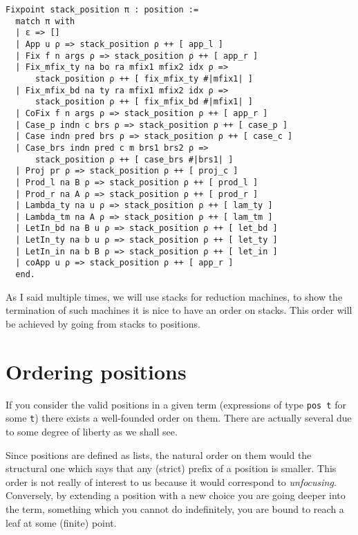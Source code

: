 \begin{verbatim}
Fixpoint stack_position π : position :=
  match π with
  | ε => []
  | App u ρ => stack_position ρ ++ [ app_l ]
  | Fix f n args ρ => stack_position ρ ++ [ app_r ]
  | Fix_mfix_ty na bo ra mfix1 mfix2 idx ρ =>
      stack_position ρ ++ [ fix_mfix_ty #|mfix1| ]
  | Fix_mfix_bd na ty ra mfix1 mfix2 idx ρ =>
      stack_position ρ ++ [ fix_mfix_bd #|mfix1| ]
  | CoFix f n args ρ => stack_position ρ ++ [ app_r ]
  | Case_p indn c brs ρ => stack_position ρ ++ [ case_p ]
  | Case indn pred brs ρ => stack_position ρ ++ [ case_c ]
  | Case_brs indn pred c m brs1 brs2 ρ =>
      stack_position ρ ++ [ case_brs #|brs1| ]
  | Proj pr ρ => stack_position ρ ++ [ proj_c ]
  | Prod_l na B ρ => stack_position ρ ++ [ prod_l ]
  | Prod_r na A ρ => stack_position ρ ++ [ prod_r ]
  | Lambda_ty na u ρ => stack_position ρ ++ [ lam_ty ]
  | Lambda_tm na A ρ => stack_position ρ ++ [ lam_tm ]
  | LetIn_bd na B u ρ => stack_position ρ ++ [ let_bd ]
  | LetIn_ty na b u ρ => stack_position ρ ++ [ let_ty ]
  | LetIn_in na b B ρ => stack_position ρ ++ [ let_in ]
  | coApp u ρ => stack_position ρ ++ [ app_r ]
  end.
\end{verbatim}

As I said multiple times, we will use stacks for reduction machines, to show the
termination of such machines it is nice to have an order on stacks. This order
will be achieved by going from stacks to positions.

\section{Ordering positions}

If you consider the valid positions in a given term (\ie expressions of type
\texttt{pos t} for some \texttt{t}) there exists a
well-founded order on them. There are actually several due to some degree of
liberty as we shall see.

Since positions are defined as lists, the natural order on them would the
structural one which says that any (strict) prefix of a position is smaller.
This order is not really of interest to us because it would correspond to
\emph{unfocusing}.
Conversely, by extending a position with a new choice you are going deeper into
the term, something which you cannot do indefinitely, you are bound to reach a
leaf at some (finite) point.

